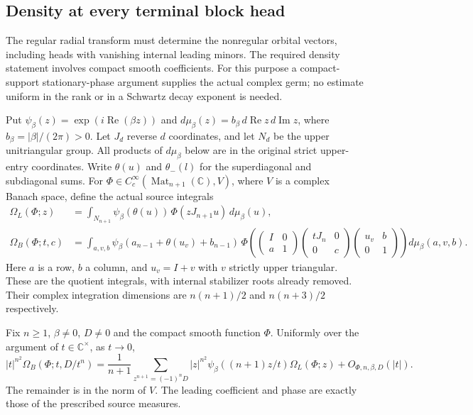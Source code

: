 \subsection{Density at every terminal block head}
\label{actual-terminal-density}

The regular radial transform must determine the nonregular orbital
vectors, including heads with vanishing internal leading minors.
The required density statement involves compact smooth coefficients.
For this purpose a compact-support stationary-phase argument supplies
the actual complex germ; no estimate uniform in the rank or in a
Schwartz decay exponent is needed.

Put $\psi_\beta(z)=\exp(i\operatorname{Re}(\beta z))$ and
$d\mu_\beta(z)=b_\beta\,d\operatorname{Re}z\,d\operatorname{Im}z$,
where $b_\beta=|\beta|/(2\pi)>0$.  Let $J_d$ reverse $d$
coordinates, and let $N_d$ be the upper unitriangular group.
All products of $d\mu_\beta$ below are in the original strict
upper-entry coordinates.  Write $\theta(u)$ and $\theta_-(l)$
for the superdiagonal and subdiagonal sums.
For $\Phi\in C_c^\infty(\operatorname{Mat}_{n+1}(\mathbb C),V)$,
where $V$ is a complex Banach space, define the actual source integrals
\begin{align*}
 \Omega_L(\Phi;z)
  &=\int_{N_{n+1}}\psi_\beta(\theta(u))\,
                         \Phi(zJ_{n+1}u)\,d\mu_\beta(u),\\
 \Omega_B(\Phi;t,c)
  &=\int_{a,v,b}\psi_\beta(a_{n-1}+\theta(u_v)+b_{n-1})\,
       \Phi\left(
       \begin{pmatrix}I&0\\a&1\end{pmatrix}
       \begin{pmatrix}tJ_n&0\\0&c\end{pmatrix}
       \begin{pmatrix}u_v&b\\0&1\end{pmatrix}\right)
                     d\mu_\beta(a,v,b).
\end{align*}
Here $a$ is a row, $b$ a column, and $u_v=I+v$ with $v$ strictly
upper triangular.  These are the quotient integrals, with internal
stabilizer roots already removed.  Their complex integration
dimensions are $n(n+1)/2$ and $n(n+3)/2$ respectively.

\begin{theorem}\label{terminal-density-compact-germ}
Fix $n\ge1$, $\beta\ne0$, $D\ne0$ and the compact smooth function
$\Phi$.  Uniformly over the argument of $t\in\mathbb C^\times$,
as $t\longrightarrow0$,
\begin{equation}\label{terminal-density-germ}
 |t|^{n^2}\Omega_B(\Phi;t,D/t^n)
  =\frac1{n+1}\sum_{z^{n+1}=(-1)^nD}
        |z|^{n^2}\psi_\beta((n+1)z/t)\Omega_L(\Phi;z)
        +O_{\Phi,n,\beta,D}(|t|).
\end{equation}
The remainder is in the norm of $V$.  The leading coefficient and
phase are exactly those of the prescribed source measures.
\end{theorem}

